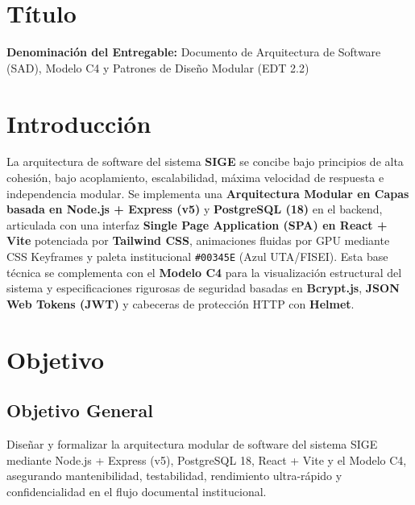 \documentclass[11pt,a4paper]{article}
\begin{document}
\section{Título}
\textbf{Denominación del Entregable:} Documento de Arquitectura de Software (SAD), Modelo C4 y Patrones de Diseño Modular (EDT 2.2)



\section{Introducción}
La arquitectura de software del sistema \textbf{SIGE} se concibe bajo principios de alta cohesión, bajo acoplamiento, escalabilidad, máxima velocidad de respuesta e independencia modular. Se implementa una \textbf{Arquitectura Modular en Capas basada en Node.js + Express (v5)} y \textbf{PostgreSQL (18)} en el backend, articulada con una interfaz \textbf{Single Page Application (SPA) en React + Vite} potenciada por \textbf{Tailwind CSS}, animaciones fluidas por GPU mediante CSS Keyframes y paleta institucional \texttt{\#00345E} (Azul UTA/FISEI). Esta base técnica se complementa con el \textbf{Modelo C4} para la visualización estructural del sistema y especificaciones rigurosas de seguridad basadas en \textbf{Bcrypt.js}, \textbf{JSON Web Tokens (JWT)} y cabeceras de protección HTTP con \textbf{Helmet}.

\section{Objetivo}

\subsection{Objetivo General}
Diseñar y formalizar la arquitectura modular de software del sistema SIGE mediante Node.js + Express (v5), PostgreSQL 18, React + Vite y el Modelo C4, asegurando mantenibilidad, testabilidad, rendimiento ultra-rápido y confidencialidad en el flujo documental institucional.
\end{document}
